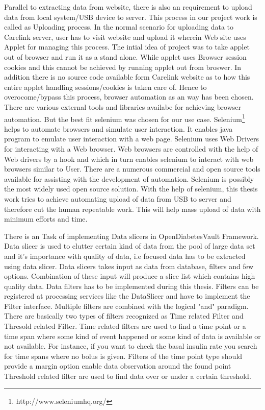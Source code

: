 \documentclass[article,type=msc,colorback,accentcolor=tud9c,twoside,11pt]{tudthesis}
\begin{document}
Parallel to extracting data from website, there is also an requirement to upload data from local system/USB device to server. This process in our project work is called as Uploading process. In the normal scenario for uploading data to Carelink server, user has to visit website and upload it wherein Web site uses Applet for managing this process. The intial idea of project was to take applet out of browser and run it as a stand alone. While applet uses Browser session cookies and this cannot be achieved by running applet out from broswer. In addition there is no source code available form Carelink website as to how this entire applet handling sessions/cookies is taken care of. Hence to overocome/bypass this process, browser automation as an way has been chosen. There are various external tools and libraries availabe for achieving browser automation. But the best fit selenium  was chosen for our use case. Selenium\footnote{http://www.seleniumhq.org/} helps to automate browsers and simulate user interaction. It enables java program to emulate user interaction with a web page. Selenium\cite{Webdriver} uses Web Drivers for interacting with a Web browser. Web browsers are controlled with the help of Web drivers by a hook and which in turn enables selenium to interact with web browsers similar to User. There are a numerous commercial and open source tools available for assisting with the development of automation. Selenium is possibly the most widely used open source solution. With the help of selenium, this thesis work tries to achieve automating upload of data from USB to server and therefore cut the human repeatable work. This will help mass upload of data with minimum efforts and time.

There is an Task of implementing Data slicers in OpenDiabetesVault Framework. Data slicer is used to clutter certain kind of data from the pool of large data set and  it's importance with quality of data, i.e focused data has to be extracted using data slicer. Data slicers takes input as data from database, filters and few options. Combination of these input will produce a slice list which contains high quality data. Data filters has to be implemented during this thesis. Filters can be registered at processing services like the DataSlicer and have to implement the Filter interface. Multiple filters are combined with the logical "and" paradigm. There are basically two types of filters recognized as Time related Filter and Thresold related Filter. Time related filters  are used to find a time point or a time span where some kind of event happened or some kind of data is available or not available. For instance, if you want to check the basal insulin rate you search for time spans where no bolus is given. Filters of the time point type should provide a margin option enable data observation around the found point Threshold related filter are used to find data over or under a certain threshold.
\end{document}
